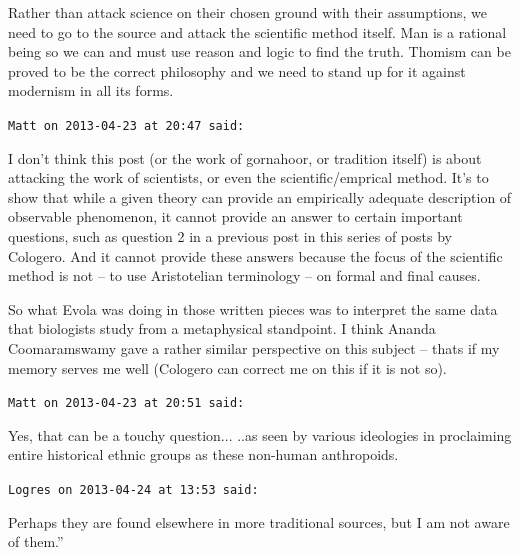 \begin{footnotesize}
\begin{sffamily}
Rather than attack science on their chosen ground with their assumptions, we need to go to the source and attack the scientific method itself. Man is a rational being so we can and must use reason and logic to find the truth. Thomism can be proved to be the correct philosophy and we need to stand up for it against modernism in all its forms.

\hfill

\texttt{Matt on 2013-04-23 at 20:47 said:}

I don't think this post (or the work of gornahoor, or tradition itself) is about attacking the work of scientists, or even the scientific/emprical method. It's to show that while a given theory can provide an empirically adequate description of observable phenomenon, it cannot provide an answer to certain important questions, such as question 2 in a previous post in this series of posts by Cologero. And it cannot provide these answers because the focus of the scientific method is not -- to use Aristotelian terminology -- on formal and final causes.

So what Evola was doing in those written pieces was to interpret the same data that biologists study from a metaphysical standpoint. I think Ananda Coomaramswamy gave a rather similar perspective on this subject -- thats if my memory serves me well (Cologero can correct me on this if it is not so).

\hfill

\texttt{Matt on 2013-04-23 at 20:51 said:}

Yes, that can be a touchy question... ..as seen by various ideologies in proclaiming entire historical ethnic groups as these non-human anthropoids.

\hfill

\texttt{Logres on 2013-04-24 at 13:53 said:}

Perhaps they are found elsewhere in more traditional sources, but I am not aware of them.''


\end{sffamily}
\end{footnotesize}
